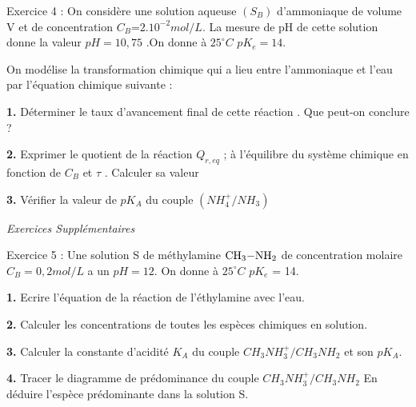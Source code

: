 \documentclass[12pt, french]{article}
\begin{document}
\begin{Box2}{Exercice 4 : }
On considère une solution aqueuse $(S_B)$ d’ammoniaque de volume V et de concentration $C_B$=$2.10^{-2} mol/L$. La mesure de pH de cette solution donne la valeur $pH = 10,75 $ .On donne à $25 ^\circ C$ $pK_e = 14$.

On modélise la transformation chimique qui a lieu entre
l’ammoniaque et l’eau par l’équation chimique suivante :


\textbf{1. }Déterminer le taux d’avancement final de cette
réaction . Que peut-on conclure ?

\textbf{2. }Exprimer le quotient de la réaction
$Q_{r,eq}$ ; à l’équilibre du système chimique en fonction de $C_B$ et  $\tau$ . Calculer sa valeur

\textbf{3. }Vérifier la valeur de $pK_A$ du couple $(NH^+_4/NH_3)$
	
\end{Box2}

\vspace{-0.8cm}
\begin{center}
   \Large{ \em{Exercices Supplémentaires}}
\end{center}


\vspace{-0.6cm}
\begin{Box2}{Exercice 5 : }
	Une solution S de méthylamine $\ce{CH_3-NH_2}$ de concentration molaire $C_B = 0,2mol/L$ a un $pH = 12$. On donne à $25^{\circ}C$ $pK_e$ = 14.

	\textbf{1. }Ecrire l’équation de la réaction de l’éthylamine avec l’eau.
	
	\textbf{2. }Calculer les concentrations de toutes les espèces chimiques en solution.

	\textbf{3. }Calculer la constante d’acidité $K_A$ du couple $CH_3NH_3^+/CH_3NH_2$ et son $pK_A$.

\textbf{4. }Tracer le diagramme  de prédominance du couple $CH_3NH_3^+/CH_3NH_2$ En déduire l’espèce prédominante dans la solution S.

\end{Box2}
\end{document}
